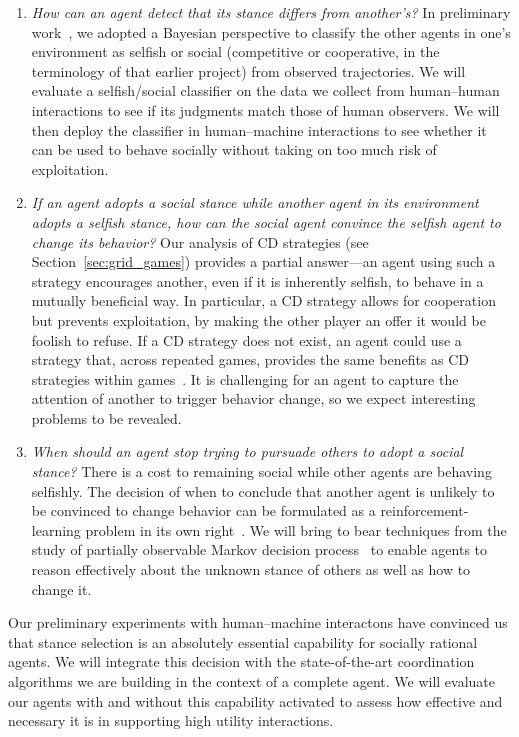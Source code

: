\begin{enumerate}

\item \emph{How can an agent detect that its stance differs from another's?}
  In preliminary work~\cite{kleiman16}, we adopted a Bayesian
  perspective to classify the other agents in one's environment as
  selfish or social (competitive or cooperative, in the terminology of
  that earlier project) from observed trajectories. We will evaluate a
  selfish/social classifier on the data we collect from human--human
  interactions to see if its judgments match those of human
  observers. We will then deploy the classifier in human--machine
  interactions to see whether it can be used to behave socially
  without taking on too much risk of exploitation.
  
\item \emph{If an agent adopts a social stance while another agent in 
  its environment adopts a selfish stance, how can the social agent
  convince the selfish agent to change its behavior?}  Our analysis of CD strategies (see
  Section~\ref{sec:grid_games}) provides a partial answer---an agent
  using such a strategy encourages another, even if it is inherently
  selfish, to behave in a mutually beneficial way.  In particular, a
  CD strategy allows for cooperation but prevents exploitation, by
  making the other player an offer it would be foolish to refuse.  If
  a CD strategy does not exist, an agent could
  use a strategy that, across repeated games, provides the same
  benefits as CD strategies within games~\cite{munoz08}. It is
  challenging for an agent to capture the attention of another to
  trigger behavior change, so we expect interesting problems to be
  revealed.

\item \emph{When should an agent stop trying to pursuade others to
  adopt a social stance?} There is a cost to remaining social while
  other agents are behaving selfishly. The decision of when to
  conclude that another agent is unlikely to be convinced to change
  behavior can be formulated as a reinforcement-learning problem in
  its own right~\cite{boutilier1996planning}. We will bring to bear
  techniques from the study of partially observable Markov decision
  process~\cite{kaelbling98} to enable agents to reason effectively
  about the unknown stance of others as well as how to change it.
  
\end{enumerate}

Our preliminary experiments with human--machine interactons have
convinced us that stance selection is an absolutely essential
capability for socially rational agents. We will integrate this
decision with the state-of-the-art coordination algorithms we are
building in the context of a complete agent. We will evaluate our
agents with and without this capability activated to assess how
effective and necessary it is in supporting high utility interactions.
